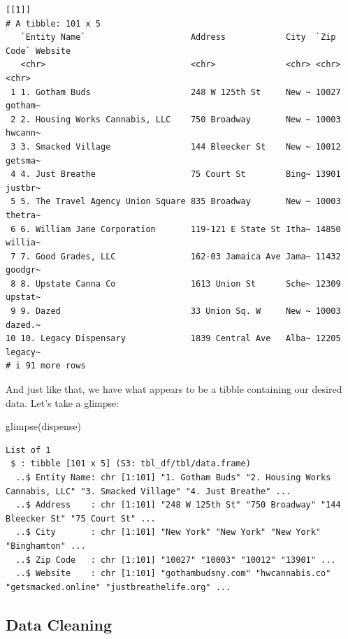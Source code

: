 \documentclass[
  letterpaper,
]{book}
\newenvironment{Shaded}{\begin{snugshade}}{\end{snugshade}}
\newcommand{\FunctionTok}[1]{\textcolor[rgb]{0.28,0.35,0.67}{#1}}
\newcommand{\NormalTok}[1]{\textcolor[rgb]{0.00,0.23,0.31}{#1}}
\begin{document}
\begin{verbatim}
[[1]]
# A tibble: 101 x 5
   `Entity Name`                     Address            City  `Zip Code` Website
   <chr>                             <chr>              <chr> <chr>      <chr>  
 1 1. Gotham Buds                    248 W 125th St     New ~ 10027      gotham~
 2 2. Housing Works Cannabis, LLC    750 Broadway       New ~ 10003      hwcann~
 3 3. Smacked Village                144 Bleecker St    New ~ 10012      getsma~
 4 4. Just Breathe                   75 Court St        Bing~ 13901      justbr~
 5 5. The Travel Agency Union Square 835 Broadway       New ~ 10003      thetra~
 6 6. William Jane Corporation       119-121 E State St Itha~ 14850      willia~
 7 7. Good Grades, LLC               162-03 Jamaica Ave Jama~ 11432      goodgr~
 8 8. Upstate Canna Co               1613 Union St      Sche~ 12309      upstat~
 9 9. Dazed                          33 Union Sq. W     New ~ 10003      dazed.~
10 10. Legacy Dispensary             1839 Central Ave   Alba~ 12205      legacy~
# i 91 more rows
\end{verbatim}

And just like that, we have what appears to be a tibble containing our
desired data. Let's take a glimpse:

\begin{Shaded}
\begin{Highlighting}[]
\FunctionTok{glimpse}\NormalTok{(dispense)}
\end{Highlighting}
\end{Shaded}

\begin{verbatim}
List of 1
 $ : tibble [101 x 5] (S3: tbl_df/tbl/data.frame)
  ..$ Entity Name: chr [1:101] "1. Gotham Buds" "2. Housing Works Cannabis, LLC" "3. Smacked Village" "4. Just Breathe" ...
  ..$ Address    : chr [1:101] "248 W 125th St" "750 Broadway" "144 Bleecker St" "75 Court St" ...
  ..$ City       : chr [1:101] "New York" "New York" "New York" "Binghamton" ...
  ..$ Zip Code   : chr [1:101] "10027" "10003" "10012" "13901" ...
  ..$ Website    : chr [1:101] "gothambudsny.com" "hwcannabis.co" "getsmacked.online" "justbreathelife.org" ...
\end{verbatim}

\hypertarget{data-cleaning}{%
\subsection{Data Cleaning}\label{data-cleaning}}
\end{document}
